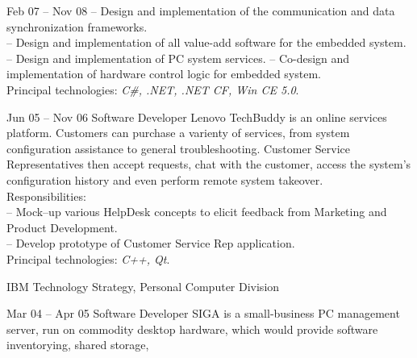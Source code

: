 \documentclass[a4paper, 10pt]{article}
\begin{document}
\begin{resume}
\begin{block}
\begin{subcategory}{Feb 07 -- Nov 08}
                -- Design and implementation of the communication and data synchronization frameworks. \\
                -- Design and implementation of all value-add software for the embedded system. \\
                -- Design and implementation of PC system services.
                -- Co-design and implementation of hardware control logic for embedded system.
                \\[1ex]
                Principal technologies: \emph{C\#, .NET, .NET CF, Win CE 5.0}.
                \bigskip
            \end{subcategory}
            \begin{subcategory}{Jun 05 -- Nov 06}
                 {Software Developer}
                Lenovo TechBuddy is an online services platform.  Customers can purchase
                a varienty of services, from system configuration assistance to general
                troubleshooting.  Customer Service Representatives then accept requests,
                chat with the customer, access the system's configuration history and even
                perform remote system takeover.
                \\[1ex]
                Responsibilities: \\
                -- Mock--up various HelpDesk concepts to elicit feedback from Marketing and Product Development. \\
                -- Develop prototype of Customer Service Rep application.
                \\[1ex]
                Principal technologies: \emph{C++, Qt}.
                \bigskip
                \bigskip
            \end{subcategory}
        \end{block}
        \begin{block}
            \begin{category}{IBM}
                 {Technology Strategy, Personal Computer Division}
                \smallskip
            \end{category}
            \begin{subcategory}{Mar 04 -- Apr 05}
                 {Software Developer}
                SIGA is a small-business PC management server, run on commodity desktop
                hardware, which would provide software inventorying, shared storage,

\end{subcategory}
\end{block}
\end{resume}
\end{document}
